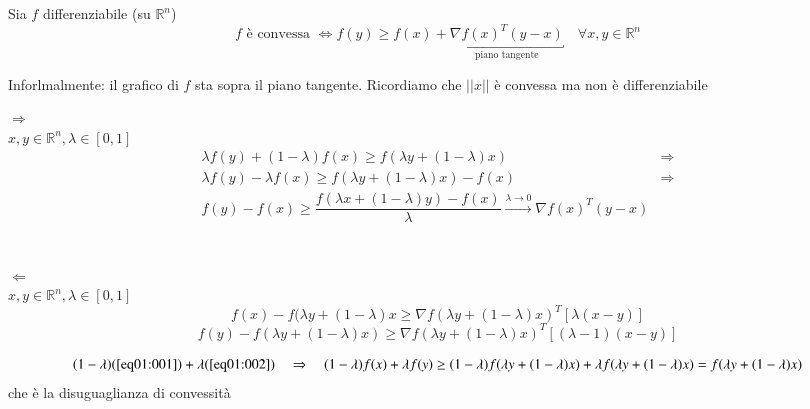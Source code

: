 \begin{theo}
\label{richiamibigi:theo01}
 Sia $f$ differenziabile (su $\mathbb{R}^{n}$)
 $$  f \text{  è convessa } \Longleftrightarrow f(y) \geq  f(x) + \underbracket{ \nabla f(x)^{T} (y-x)}_{\text{piano tangente}} \quad \forall x, y \in \mathbb{R}^{n}$$
\end{theo}
 Inforlmalmente: il grafico di $f$ sta sopra il piano tangente.
 Ricordiamo che $||x||$ è convessa ma non è differenziabile
\begin{thproof} $\Longrightarrow$ \\ $x,y \in \mathbb{R}^{n}, \lambda
\in [0,1]$ \\
$$
\begin{array}{ll}
\lambda f(y) + (1- \lambda) f(x)  \geq f(\lambda y + (1-\lambda)x)  & \Rightarrow \\
   \lambda f(y) -  \lambda f(x)  \geq f(\lambda y + (1-\lambda)x) -f(x) & \Rightarrow \\
   f(y) -  f(x)  \geq \dfrac{f(\lambda x + (1-\lambda)y) -f(x)}{\lambda}  \xrightarrow{\lambda \to 0} 
 \nabla f(x)^{T} (y-x) &
\end{array} 
$$
  \\ \\
 $\Longleftarrow$ \\
  $x,y \in \mathbb{R}^{n}, \lambda \in [0,1]$ \\
  \begin{equation}
    \label{eq01:001}    
f(x) - f(\lambda y + (1-\lambda)x \geq 
  \nabla f(\lambda y  + (1 - \lambda)x)^{T}[\lambda(x-y)]
  \end{equation}
  \begin{equation}
    \label{eq01:002}    
f(y) - f(\lambda y + (1-\lambda)x ) \geq 
  \nabla f(\lambda y  + (1 - \lambda)x)^{T}[(\lambda -1)(x-y)]
  \end{equation}


$$(1-\lambda) (\ref{eq01:001}) 
+ \lambda (\ref{eq01:002})
\quad \Rightarrow \quad 
(1-\lambda) f(x) + \lambda f(y) \geq
(1-\lambda)f(\lambda y + (1-\lambda)x) + \lambda f(\lambda y +
(1-\lambda)x) = f(\lambda y + (1-\lambda)x)
$$
che è la disuguaglianza di convessità
\end{thproof}
